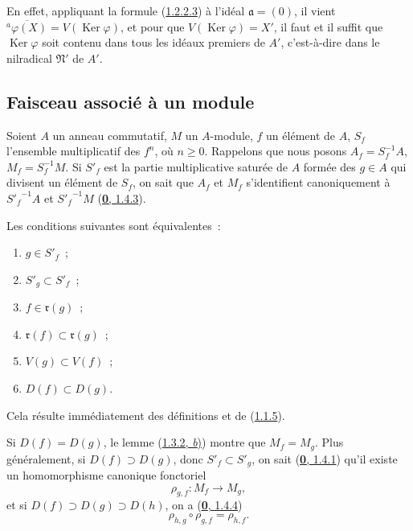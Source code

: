 En effet, appliquant la formule (\hyperref[I.1.2.2.3-fr]{1.2.2.3}) à l'idéal
$\mathfrak{a}=(0)$, il vient
$\overline{{}^a\varphi(X)}=V(\operatorname{Ker}\varphi)$, et pour que
$V(\operatorname{Ker}\varphi)=X'$, il faut et il suffit que
$\operatorname{Ker}\varphi$ soit contenu dans tous les idéaux premiers de
$A'$, c'est-à-dire dans le nilradical $\mathfrak{N}'$ de $A'$.

\subsection{Faisceau associé à un module}
\label{subsection:I.1.3-fr}
\label{I.1.3-fr}

\begin{env}[1.3.1]
\label{I.1.3.1-fr}
Soient $A$ un anneau commutatif, $M$ un $A$-module, $f$ un élément de $A$,
$S_f$ l'ensemble multiplicatif des $f^n$, où $n\geq0$. Rappelons que nous
posons $A_f=S_f^{-1}A$, $M_f=S_f^{-1}M$. Si $S'_f$ est la partie
multiplicative saturée de $A$ formée des $g\in A$ qui divisent un élément de
$S_f$, on sait que $A_f$ et $M_f$ s'identifient canoniquement à
${S'_f}^{-1}A$ et ${S'_f}^{-1}M$
(\hyperref[0.1.4.3-fr]{\textbf{0}, 1.4.3}).
\end{env}

\begin{lemma}[1.3.2]
\label{I.1.3.2-fr}
Les conditions suivantes sont équivalentes~:
\begin{enumerate}
  \item[\textit{a})] $g\in S'_f$~;
  \item[\textit{b})] $S'_g\subset S'_f$~;
  \item[\textit{c})] $f\in\mathfrak{r}(g)$~;
  \item[\textit{d})] $\mathfrak{r}(f)\subset\mathfrak{r}(g)$~;
  \item[\textit{e})] $V(g)\subset V(f)$~;
  \item[\textit{f})] $D(f)\subset D(g)$.
\end{enumerate}
\end{lemma}

Cela résulte immédiatement des définitions et de
(\hyperref[I.1.1.5-fr]{1.1.5}).

\begin{env}[1.3.3]
\label{I.1.3.3-fr}
Si $D(f)=D(g)$, le lemme (\hyperref[I.1.3.2-fr]{1.3.2, \textit{b})}) montre que
$M_f=M_g$. Plus généralement, si $D(f)\supset D(g)$, donc
$S'_f\subset S'_g$, on sait (\hyperref[0.1.4.1-fr]{\textbf{0}, 1.4.1}) qu'il existe un
homomorphisme canonique fonctoriel
\[
  \rho_{g,f}:M_f\longrightarrow M_g,
\]
et si $D(f)\supset D(g)\supset D(h)$, on a
(\hyperref[0.1.4.4-fr]{\textbf{0}, 1.4.4})
\begin{equation}
  \rho_{h,g}\circ\rho_{g,f}=\rho_{h,f}.
  \tag{1.3.3.1}\label{I.1.3.3.1-fr}
\end{equation}
\end{env}

